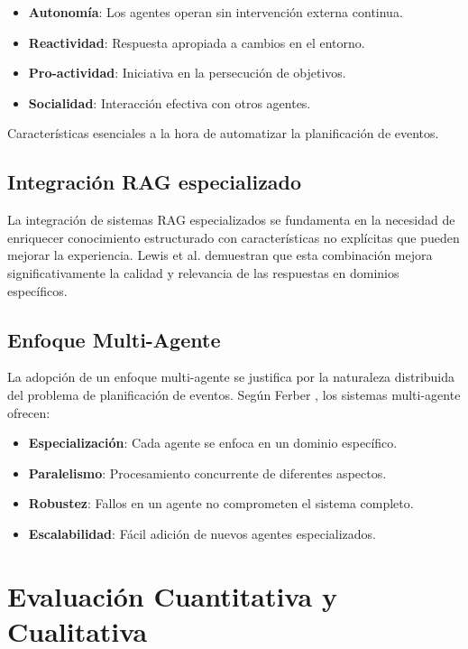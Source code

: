 \documentclass[runningheads,a4paper]{llncs}
\begin{document}
\begin{itemize}
    \item \textbf{Autonomía}: Los agentes operan sin intervención externa continua.
    \item \textbf{Reactividad}: Respuesta apropiada a cambios en el entorno.
    \item \textbf{Pro-actividad}: Iniciativa en la persecución de objetivos.
    \item \textbf{Socialidad}: Interacción efectiva con otros agentes.
\end{itemize}

Características esenciales a la hora de automatizar la planificación de eventos.

\subsection{Integración RAG especializado}

La integración de sistemas RAG especializados se fundamenta en la necesidad de enriquecer conocimiento estructurado con 
características no explícitas que pueden mejorar la experiencia. Lewis et al. demuestran que esta combinación mejora 
significativamente la calidad y relevancia de las respuestas en dominios específicos.

\subsection{Enfoque Multi-Agente}

La adopción de un enfoque multi-agente se justifica por la naturaleza distribuida del problema de planificación de eventos. 
Según Ferber \cite{ferber1999multi}, los sistemas multi-agente ofrecen:

\begin{itemize}
    \item \textbf{Especialización}: Cada agente se enfoca en un dominio específico.
    \item \textbf{Paralelismo}: Procesamiento concurrente de diferentes aspectos.
    \item \textbf{Robustez}: Fallos en un agente no comprometen el sistema completo.
    \item \textbf{Escalabilidad}: Fácil adición de nuevos agentes especializados.
\end{itemize}

\section{Evaluación Cuantitativa y Cualitativa}
\end{document}
